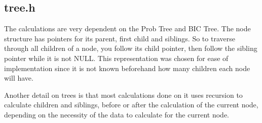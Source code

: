 \documentclass[brazil,11pt]{article}
\begin{document}
\subsection{tree.h}

The calculations are very dependent on the Prob Tree and BIC Tree. The node structure has pointers for its parent, first child and siblings. So to traverse through all children of a node, you follow its child pointer, then follow the sibling pointer while it is not NULL. This representation was chosen for ease of implementation since it is not known beforehand how many children each node will have.

Another detail on trees is that most calculations done on it uses recursion to calculate children and siblings, before or after the calculation of the current node, depending on the necessity of the data to calculate for the current node.


 
\end{document}
